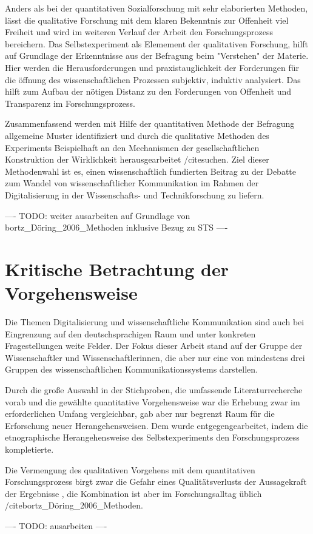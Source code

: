 Anders als bei der quantitativen Sozialforschung mit sehr elaborierten Methoden,
lässt die qualitative Forschung mit dem klaren Bekenntnis zur Offenheit viel Freiheit und wird im weiteren Verlauf der Arbeit den Forschungsprozess bereichern. Das Selbstexperiment als Elemement der qualitativen Forschung, hilft auf Grundlage der Erkenntnisse aus der Befragung beim "Verstehen" der Materie. Hier werden die Herausforderungen und praxistauglichkeit der Forderungen für die öffnung des wissenschaftlichen Prozessen subjektiv, induktiv analysiert. Das hilft zum Aufbau der nötigen Distanz zu den Forderungen von Offenheit und Transparenz im Forschungsprozess.

Zusammenfassend werden mit Hilfe der quantitativen Methode der Befragung allgemeine Muster identifiziert und durch die qualitative Methoden des Experiments Beispielhaft an den Mechanismen der gesellschaftlichen Konstruktion der Wirklichkeit herausgearbeitet /cite{suchen}. Ziel dieser Methodenwahl ist es, einen wissenschaftlich fundierten Beitrag zu der Debatte zum Wandel von wissenschaftlicher Kommunikation im Rahmen der Digitalisierung in der Wissenschafts- und Technikforschung zu liefern.

---- TODO: weiter ausarbeiten auf Grundlage von bortz_Döring_2006_Methoden inklusive Bezug zu STS ----

\section{Kritische Betrachtung der Vorgehensweise}

Die Themen Digitalisierung und wissenschaftliche Kommunikation sind auch bei Eingrenzung auf den deutschsprachigen Raum und unter konkreten Fragestellungen weite Felder. Der Fokus dieser Arbeit stand auf der Gruppe der Wissenschaftler und Wissenschaftlerinnen, die aber nur eine von mindestens drei Gruppen des wissenschaftlichen Kommunikationssystems darstellen.

Durch die große Auswahl in der Stichproben, die umfassende Literaturrecherche vorab und die gewählte quantitative Vorgehensweise war die Erhebung zwar im erforderlichen Umfang vergleichbar, gab aber nur begrenzt Raum für die Erforschung neuer Herangehensweisen. Dem wurde entgegengearbeitet, indem die etnographische Herangehensweise des Selbstexperiments den Forschungsprozess kompletierte.

Die Vermengung des qualitativen Vorgehens mit dem quantitativen Forschungsprozess birgt zwar die Gefahr eines Qualitätsverlusts der Aussagekraft der Ergebnisse \cite{suchen_Lamek_1993:198}, die Kombination ist aber im Forschungsalltag üblich /cite{bortz_Döring_2006_Methoden}.

---- TODO: ausarbeiten ----
